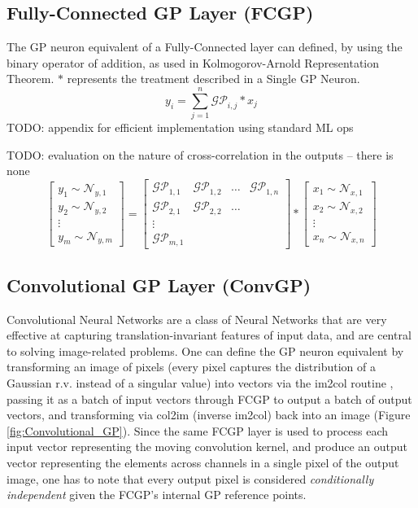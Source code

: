 \documentclass{article}
\begin{document}
\subsection{Fully-Connected GP Layer (FCGP)}
The GP neuron equivalent of a Fully-Connected layer can defined, by using the binary operator of addition, as used in Kolmogorov-Arnold Representation Theorem. $\ast$ represents the treatment described in a Single GP Neuron.
\begin{equation}
    y_i = \sum_{j=1}^{n} \mathcal{GP}_{i,j} \ast x_j
\end{equation}
TODO: appendix for efficient implementation using standard ML ops

TODO: evaluation on the nature of cross-correlation in the outputs -- there is none
\begin{equation}
    \begin{bmatrix}
        y_1\sim\mathcal{N}_{y,1} \\ y_2\sim\mathcal{N}_{y,2} \\ \vdots \\ y_m\sim\mathcal{N}_{y,m}
    \end{bmatrix} =
    \begin{bmatrix}
        \mathcal{GP}_{1,1} & \mathcal{GP}_{1,2} & \hdots & \mathcal{GP}_{1,n} \\
        \mathcal{GP}_{2,1} & \mathcal{GP}_{2,2} & \hdots \\
        \vdots \\
        \mathcal{GP}_{m,1}
    \end{bmatrix}\ast
    \begin{bmatrix}
        x_1\sim\mathcal{N}_{x,1} \\ x_2\sim\mathcal{N}_{x,2} \\ \vdots \\ x_n\sim\mathcal{N}_{x,n}
    \end{bmatrix}
\end{equation}

\subsection{Convolutional GP Layer (ConvGP)}
Convolutional Neural Networks \cite{CNN} are a class of Neural Networks that are very effective at capturing translation-invariant features of input data, and are central to solving image-related problems. One can define the GP neuron equivalent by transforming an image of pixels (every pixel captures the distribution of a Gaussian r.v. instead of a singular value) into vectors via the im2col routine \cite{im2col_first,im2col_phdthesis}, passing it as a batch of input vectors through FCGP to output a batch of output vectors, and transforming via col2im (inverse im2col) back into an image (Figure \ref{fig:Convolutional_GP}). Since the same FCGP layer is used to process each input vector representing the moving convolution kernel, and produce an output vector representing the elements across channels in a single pixel of the output image, one has to note that every output pixel is considered \textit{conditionally independent} given the FCGP's internal GP reference points.
\end{document}
